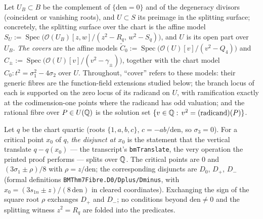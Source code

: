 \begin{definition}\label{def:cover_models}
Let $U_{B}\subset B$ be the complement of $\{\mathrm{den}=0\}$ and of the
degeneracy divisors (coincident or vanishing roots), and $U\subset S$ its
preimage in the splitting surface; concretely, the splitting surface over the
chart is the affine model
$S_{U}:=\operatorname{Spec}\bigl(\mathcal O(U_{B})[z,w]/(z^{2}-R_{q},\,w^{2}-S_{q})\bigr)$,
and $U$ is its open part over $U_{B}$.  \emph{The covers} are the affine models
$\widetilde C_{0}:=\operatorname{Spec}\bigl(\mathcal O(U)[v]/(v^{2}-Q_{4})\bigr)$
and $C_{\pm}:=\operatorname{Spec}\bigl(\mathcal O(U)[v]/(v^{2}-\gamma_{\pm})\bigr)$,
together with the chart model $C_{0}\colon t^{2}=\sigma_{1}^{2}-4\sigma_{2}$
over $U$.  Throughout, ``cover'' refers to these models: their generic fibres
are the function-field extensions studied below; the branch locus of each is supported on the zero locus of its radicand on
$U$, with ramification exactly at the codimension-one points where the
radicand has odd valuation; and the rational fibre over
$P\in U(\mathbb{Q})$ is the solution set $\{v\in\mathbb{Q}:\,v^{2}=(\text{radicand})(P)\}$.
\end{definition}

\begin{definition}\label{def:disjuncts}
Let $q$ be the chart quartic (roots $\{1,a,b,c\}$, $c=-ab/\mathrm{den}$, so
$\sigma_{3}=0$).  For a critical point $x_{0}$ of $q$, \emph{the disjunct at
$x_{0}$} is the statement that the vertical translate $q-q(x_{0})$ --- the
transcript's \texttt{bmTranslate}, the very operation the printed proof
performs --- splits over $\mathbb{Q}$.  The critical points are $0$ and
$(3\sigma_{1}\pm\rho)/8$ with $\rho=z/\mathrm{den}$; the corresponding
disjuncts are $D_{0}$, $D_{+}$, $D_{-}$ (formal definitions
\texttt{BMThm7Fibre.D0/Dplus/Dminus}, with $x_{0}=(3s_{1n}\pm z)/(8\,
\mathrm{den})$ in cleared coordinates).  Exchanging the sign of the square
root $\rho$ exchanges $D_{+}$ and $D_{-}$; no conditions beyond
$\mathrm{den}\neq0$ and the splitting witness $z^{2}=R_{q}$ are folded into
the predicates.
\end{definition}


